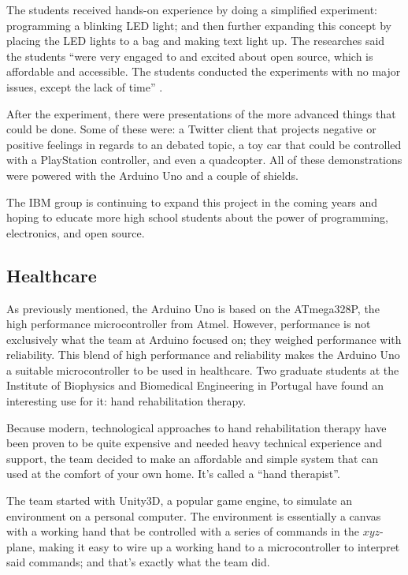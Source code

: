 \documentclass[11pt,letterpaper,twocolumn]{article}
\begin{document}
The students received hands-on experience by doing a simplified experiment: programming a blinking LED light; and then further expanding this concept by placing the LED lights to a bag and making text light up. The researches said the students ``were very engaged to and excited about open source, which is affordable and accessible. The students conducted the experiments with no major issues, except the lack of time'' \cite{students}.

After the experiment, there were presentations of the more advanced things that could be done. Some of these were: a Twitter client that projects negative or positive feelings in regards to an debated topic, a toy car that could be controlled with a PlayStation controller, and even a quadcopter. All of these demonstrations were powered with the Arduino Uno and a couple of shields.

The IBM group is continuing to expand this project in the coming years and hoping to educate more high school students about the power of programming, electronics, and open source.

\subsection{Healthcare}
As previously mentioned, the Arduino Uno is based on the ATmega328P, the high performance microcontroller from Atmel. However, performance is not exclusively what the team at Arduino focused on; they weighed performance with reliability. This blend of high performance and reliability makes the Arduino Uno a suitable microcontroller to be used in healthcare. Two graduate students at the Institute of Biophysics and Biomedical Engineering in Portugal have found an interesting use for it: hand rehabilitation therapy.

Because modern, technological approaches to hand rehabilitation therapy have been proven to be quite expensive and needed heavy technical experience and support, the team decided to make an affordable and simple system that can used at the comfort of your own home. It's called a ``hand therapist''.

The team started with Unity3D, a popular game engine, to simulate an environment on a personal computer. The environment is essentially a canvas with a working hand that be controlled with a series of commands in the $xyz$-plane, making it easy to wire up a working hand to a microcontroller to interpret said commands; and that's exactly what the team did.
\end{document}
